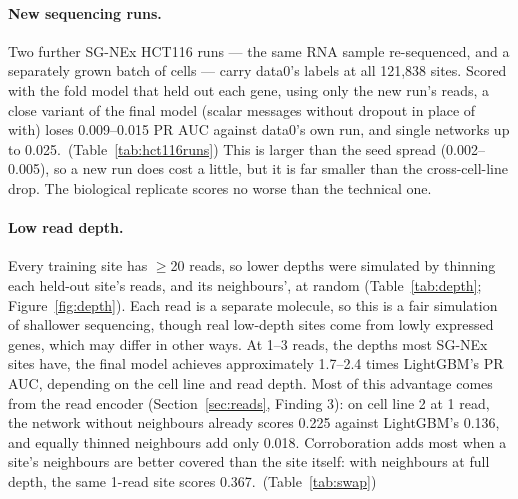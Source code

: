 \documentclass[11pt,a4paper]{article}
\begin{document}
\paragraph{New sequencing runs.} Two further SG-NEx HCT116 runs --- the same
RNA sample re-sequenced, and a separately grown batch of cells --- carry
data0's labels at all 121,838 sites. Scored with the fold model that held
out each gene, using only the new run's reads, a close variant of the final
model (scalar messages without dropout in place of with) loses 0.009--0.015
PR AUC against data0's own run, and single networks up to
0.025.~(Table~\ref{tab:hct116runs}) This is larger than the seed spread
(0.002--0.005), so a new run does cost a little, but it is far smaller than
the cross-cell-line drop. The biological replicate scores no worse than
the technical one.

\paragraph{Low read depth.} Every training site has $\ge$20 reads, so lower
depths were simulated by thinning each held-out site's reads, and its
neighbours', at random (Table~\ref{tab:depth}; Figure~\ref{fig:depth}). Each
read is a separate molecule, so this is a fair simulation of shallower
sequencing, though real low-depth sites come from lowly expressed genes,
which may differ in other ways. At 1--3 reads, the depths most SG-NEx sites
have, the final model achieves approximately 1.7--2.4 times LightGBM's PR
AUC, depending on the cell line and read depth. Most of this
advantage comes from the read encoder (Section~\ref{sec:reads}, Finding 3):
on cell line 2 at 1 read, the network without neighbours already scores
0.225 against LightGBM's 0.136, and equally thinned neighbours add only
0.018. Corroboration adds most when a site's neighbours are better covered
than the site itself: with neighbours at full depth, the same 1-read site
scores 0.367.~(Table~\ref{tab:swap})


\end{document}

